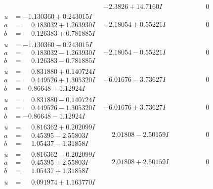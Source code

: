 \documentclass[1p]{elsarticle_modified}
\theoremstyle{definition}
\begin{document}
$$\begin{array}{c|c|c}
 & -2.3826 + 14.7160 I & \phantom{-0.000000 } 0 \\ \hline\begin{aligned}
u &= -1.130360 + 0.243015 I \\
a &= \phantom{-}0.183032 + 1.263930 I \\
b &= \phantom{-}0.126383 + 0.781885 I\end{aligned}
 & -2.18054 + 0.55221 I & \phantom{-0.000000 } 0 \\ \hline\begin{aligned}
u &= -1.130360 - 0.243015 I \\
a &= \phantom{-}0.183032 - 1.263930 I \\
b &= \phantom{-}0.126383 - 0.781885 I\end{aligned}
 & -2.18054 - 0.55221 I & \phantom{-0.000000 } 0 \\ \hline\begin{aligned}
u &= \phantom{-}0.831880 + 0.140724 I \\
a &= \phantom{-}0.449526 + 1.305320 I \\
b &= -0.86648 + 1.12924 I\end{aligned}
 & -6.01676 - 3.73627 I & \phantom{-0.000000 } 0 \\ \hline\begin{aligned}
u &= \phantom{-}0.831880 - 0.140724 I \\
a &= \phantom{-}0.449526 - 1.305320 I \\
b &= -0.86648 - 1.12924 I\end{aligned}
 & -6.01676 + 3.73627 I & \phantom{-0.000000 } 0 \\ \hline\begin{aligned}
u &= \phantom{-}0.816362 + 0.202099 I \\
a &= \phantom{-}0.45395 - 2.55803 I \\
b &= \phantom{-}1.05437 - 1.31858 I\end{aligned}
 & \phantom{-}2.01808 - 2.50159 I & \phantom{-0.000000 } 0 \\ \hline\begin{aligned}
u &= \phantom{-}0.816362 - 0.202099 I \\
a &= \phantom{-}0.45395 + 2.55803 I \\
b &= \phantom{-}1.05437 + 1.31858 I\end{aligned}
 & \phantom{-}2.01808 + 2.50159 I & \phantom{-0.000000 } 0 \\ \hline\begin{aligned}
u &= \phantom{-}0.091974 + 1.163770 I \\

\end{aligned}
\end{array}$$
\end{document}
